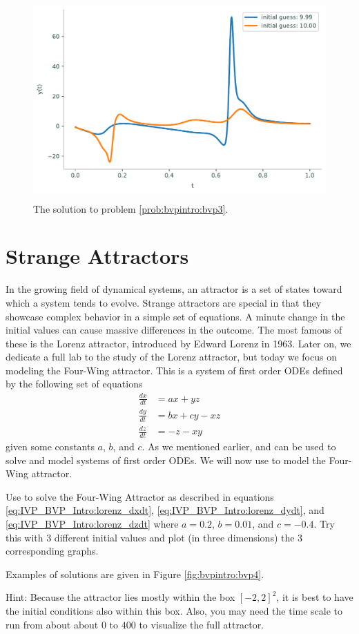 \begin{figure}[H]
    \centering
    \includegraphics[height=3in]{figures/problem3.pdf}
    \caption{The solution to problem \ref{prob:bvpintro:bvp3}.}
    \label{fig:bvpintro:bvp3}
\end{figure}

\section*{Strange Attractors}
In the growing field of dynamical systems, an attractor is a set of states toward which a system tends to evolve.
Strange attractors are special in that they showcase complex behavior in a simple set of equations.
A minute change in the initial values can cause massive differences in the outcome.
The most famous of these is the Lorenz attractor, introduced by Edward Lorenz in 1963.
Later on, we dedicate a full lab to the study of the Lorenz attractor, but today we focus on modeling the Four-Wing attractor.
This is a system of first order ODEs defined by the following set of equations
\begin{align}
    \frac{dx}{dt} &= ax + yz \label{eq:IVP_BVP_Intro:lorenz_dxdt} \\
    \frac{dy}{dt} &= bx + cy - xz \label{eq:IVP_BVP_Intro:lorenz_dydt} \\
    \frac{dz}{dt} &= -z - xy \label{eq:IVP_BVP_Intro:lorenz_dzdt}
\end{align}
given some constants $a$, $b$, and $c$.
As we mentioned earlier,  and  can be used to solve and model systems of first order ODEs. We will now use  to model the Four-Wing attractor.

\begin{problem}
    \label{prob:bvpintro:bvp4}
Use  to solve the Four-Wing Attractor as described in equations \eqref{eq:IVP_BVP_Intro:lorenz_dxdt}, \eqref{eq:IVP_BVP_Intro:lorenz_dydt}, and \eqref{eq:IVP_BVP_Intro:lorenz_dzdt} where $a=0.2$, $b = 0.01$, and $c = -0.4$. Try this with 3 different initial values and plot (in three dimensions) the 3 corresponding graphs.

Examples of solutions are given in Figure \ref{fig:bvpintro:bvp4}.

Hint: Because the attractor lies mostly within the box $[-2,2]^2$, it is best to have the initial conditions also within this box. Also, you may need the time scale to run from about about $0$ to $400$ to visualize the full attractor.
\end{problem}

